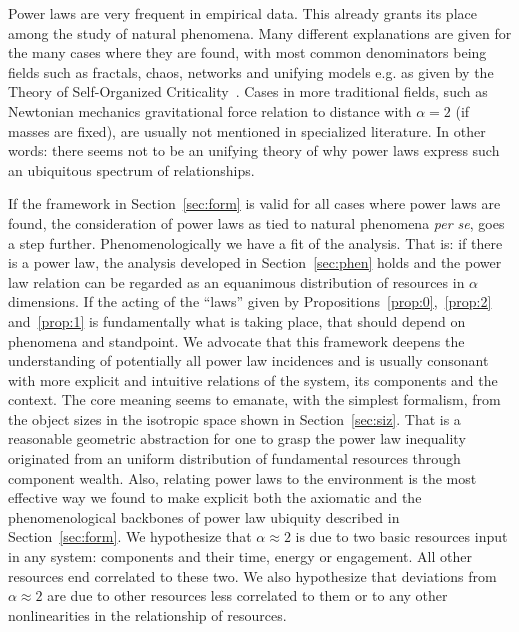 \documentclass[a4paper, 11pt]{article} %
\begin{document}
Power laws are very frequent in empirical data.
This already grants its place among the study of natural phenomena.
Many different explanations are given for the many cases where
they are found, with most common denominators being fields such as
fractals, chaos, networks and unifying models e.g. as given by the Theory of Self-Organized Criticality~\cite{part}. Cases in more traditional fields, such as Newtonian mechanics gravitational force relation to distance with $\alpha=2$ (if masses are fixed), are usually not mentioned in specialized literature. In other words: there seems not to be an unifying theory of why power laws express such
an ubiquitous spectrum of relationships.

If the framework in Section~\ref{sec:form} is valid for all cases where power laws are found,
the consideration of power laws as tied to natural phenomena \emph{per se}, goes a step further. 
Phenomenologically we have a fit of the analysis.
That is: if there is
a power law, the analysis developed in Section~\ref{sec:phen} holds
and
the power law relation can be regarded as an equanimous distribution
of resources in $\alpha$ dimensions.
If the acting of the ``laws'' given by Propositions~\ref{prop:0},~\ref{prop:2} and~\ref{prop:1} is fundamentally what is taking place, that should depend on phenomena
and standpoint.
We advocate that this framework deepens the understanding of potentially all power law
incidences and is usually consonant with more explicit and intuitive 
relations of the system, its components and the context.
The core meaning seems to emanate, with the simplest formalism, from
the object sizes in the isotropic space shown in Section~\ref{sec:siz}.
That is a reasonable geometric abstraction for
one to grasp the power law inequality originated from
an uniform distribution
of fundamental resources through component wealth.
Also, relating power laws to the environment is the most effective
way we found to make explicit both the axiomatic
and the phenomenological backbones of power law ubiquity described in
Section~\ref{sec:form}.
We hypothesize that $\alpha \approx 2$ is due to two basic resources
input in any system: components and their time, energy or engagement.
All other resources end correlated to these two.
We also hypothesize that deviations from $\alpha \approx 2$ are due
to other resources less correlated to them
or to any other nonlinearities in the relationship of resources.
\end{document}
